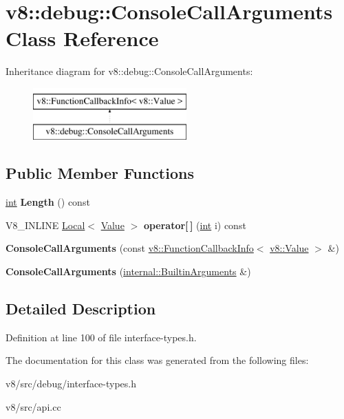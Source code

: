 \hypertarget{classv8_1_1debug_1_1ConsoleCallArguments}{}\section{v8\+:\+:debug\+:\+:Console\+Call\+Arguments Class Reference}
\label{classv8_1_1debug_1_1ConsoleCallArguments}
Inheritance diagram for v8\+:\+:debug\+:\+:Console\+Call\+Arguments\+:\begin{figure}[H]
\begin{center}
\leavevmode
\includegraphics[height=2.000000cm]{classv8_1_1debug_1_1ConsoleCallArguments}
\end{center}
\end{figure}
\subsection*{Public Member Functions}
\begin{DoxyCompactItemize}
\item 
\mbox{\label{classv8_1_1debug_1_1ConsoleCallArguments_a69998916a4c2f5fb7565dfebb69bfa7e}} 
\mbox{\hyperlink{classint}{int}} {\bfseries Length} () const
\item 
\mbox{\label{classv8_1_1debug_1_1ConsoleCallArguments_a59b767d6646822eea44d6c957161f352}} 
V8\+\_\+\+I\+N\+L\+I\+NE \mbox{\hyperlink{classv8_1_1Local}{Local}}$<$ \mbox{\hyperlink{classv8_1_1Value}{Value}} $>$ {\bfseries operator\mbox{[}$\,$\mbox{]}} (\mbox{\hyperlink{classint}{int}} i) const
\item 
\mbox{\label{classv8_1_1debug_1_1ConsoleCallArguments_a9a576f4d4a1900ba111f1603cfe31a12}} 
{\bfseries Console\+Call\+Arguments} (const \mbox{\hyperlink{classv8_1_1FunctionCallbackInfo}{v8\+::\+Function\+Callback\+Info}}$<$ \mbox{\hyperlink{classv8_1_1Value}{v8\+::\+Value}} $>$ \&)
\item 
\mbox{\label{classv8_1_1debug_1_1ConsoleCallArguments_a5a471d4850c0dfd01a3f600183de7d48}} 
{\bfseries Console\+Call\+Arguments} (\mbox{\hyperlink{classv8_1_1internal_1_1BuiltinArguments}{internal\+::\+Builtin\+Arguments}} \&)
\end{DoxyCompactItemize}


\subsection{Detailed Description}


Definition at line 100 of file interface-\/types.\+h.



The documentation for this class was generated from the following files\+:\begin{DoxyCompactItemize}
\item 
v8/src/debug/interface-\/types.\+h\item 
v8/src/api.\+cc\end{DoxyCompactItemize}
